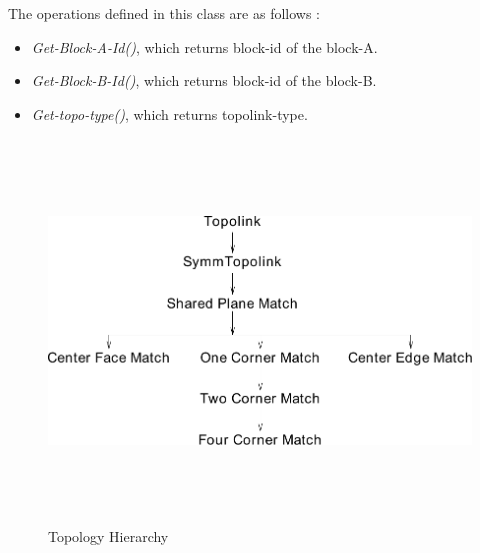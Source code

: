 	The operations defined in this class are as follows :
			\begin{itemize}
			\item
        	{\em Get-Block-A-Id()}, which returns block-id of the block-A. 
			\item
        	{\em Get-Block-B-Id()}, which returns block-id of the block-B.
			\item
        	{\em Get-topo-type()}, which returns topolink-type.
			\end{itemize}

            \begin{figure}[htbp]
\includegraphics[width=6.0in,height=4.0in]{TOPO.pdf}
            \caption{Topology Hierarchy}
            \label{topo}
            \end{figure}


